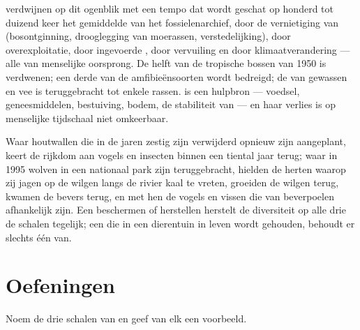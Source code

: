 \begin{proposition}\label{prop:g10:biodiversity-scales:present}
 verdwijnen op dit ogenblik met een tempo dat wordt geschat op
honderd tot duizend keer het gemiddelde van het fossielenarchief, door
de vernietiging van  (bosontginning, drooglegging van
moerassen, verstedelijking), door overexploitatie, door ingevoerde
, door vervuiling en door klimaatverandering --- alle van
menselijke oorsprong. De helft van de tropische bossen van 1950 is
verdwenen; een derde van de amfibieënsoorten wordt bedreigd; de
 van gewassen en vee is teruggebracht tot enkele
rassen.  is een hulpbron --- voedsel, geneesmiddelen,
bestuiving, bodem, de stabiliteit van  --- en haar verlies is
op menselijke tijdschaal niet omkeerbaar.
\end{proposition}
\admitted

\begin{example}\label{ex:g10:biodiversity-scales:reversing}
Waar houtwallen die in de jaren zestig zijn verwijderd opnieuw zijn
aangeplant, keert de rijkdom aan vogels en insecten binnen een tiental
jaar terug; waar in 1995 wolven in een nationaal park zijn
teruggebracht, hielden de herten waarop zij jagen op de wilgen langs de
rivier kaal te vreten, groeiden de wilgen terug, kwamen de bevers terug,
en met hen de vogels en vissen die van beverpoelen afhankelijk zijn. Een
 beschermen of herstellen herstelt de diversiteit op alle drie
de schalen tegelijk; een  die in een dierentuin in leven wordt
gehouden, behoudt er slechts één van.
\end{example}

\section{Oefeningen}

\begin{exercise}[$\star$]\label{exo:g10:biodiversity-scales:1}
Noem de drie schalen van  en geef van elk een voorbeeld.
\end{exercise}

